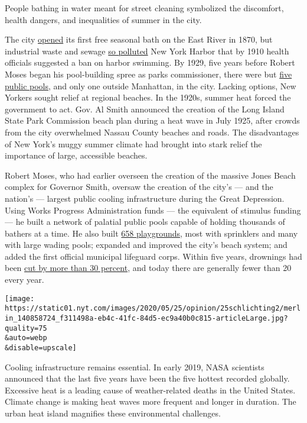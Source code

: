 People bathing in water meant for street cleaning symbolized the
discomfort, health dangers, and inequalities of summer in the city.

The city \href{https://www.nycgovparks.org/about/history/pools}{opened}
its first free seasonal bath on the East River in 1870, but industrial
waste and sewage
\href{https://babel.hathitrust.org/cgi/pt?id=coo1.ark:/13960/t1jh43s08\&view=1up\&seq=8}{so
polluted} New York Harbor that by 1910 health officials suggested a ban
on harbor swimming. By 1929, five years before Robert Moses began his
pool-building spree as parks commissioner, there were but
\href{https://www.nycgovparks.org/about/history/pools}{five public
pools}, and only one outside Manhattan, in the city. Lacking options,
New Yorkers sought relief at regional beaches. In the 1920s, summer heat
forced the government to act. Gov. Al Smith announced the creation of
the Long Island State Park Commission beach plan during a heat wave in
July 1925, after crowds from the city overwhelmed Nassau County beaches
and roads. The disadvantages of New York's muggy summer climate had
brought into stark relief the importance of large, accessible beaches.

Robert Moses, who had earlier overseen the creation of the massive Jones
Beach complex for Governor Smith, oversaw the creation of the city's ---
and the nation's --- largest public cooling infrastructure during the
Great Depression. Using Works Progress Administration funds --- the
equivalent of stimulus funding --- he built a network of palatial public
pools capable of holding thousands of bathers at a time. He also built
\href{https://www.nytimes.com/1981/07/30/obituaries/robert-moses-master-builder-is-dead-at-92.html}{658
playgrounds}, most with sprinklers and many with large wading pools;
expanded and improved the city's beach system; and added the first
official municipal lifeguard corps. Within five years, drownings had
been
\href{https://nypost.com/2020/04/17/1940-city-parks-dept-report-links-decrease-in-drownings-with-opening-pools/}{cut
by more than 30 percent}, and today there are generally fewer than 20
every year.

\texttt{[image: https://static01.nyt.com/images/2020/05/25/opinion/25schlichting2/merlin\_140858724\_f311498a-eb4c-41fc-84d5-ec9a40b0c815-articleLarge.jpg?quality=75\\\&auto=webp\\\&disable=upscale]}

Cooling infrastructure remains essential. In early 2019, NASA scientists
announced that the last five years have been the five hottest recorded
globally. Excessive heat is a leading cause of weather-related deaths in
the United States. Climate change is making heat waves more frequent and
longer in duration. The urban heat island magnifies these environmental
challenges.

